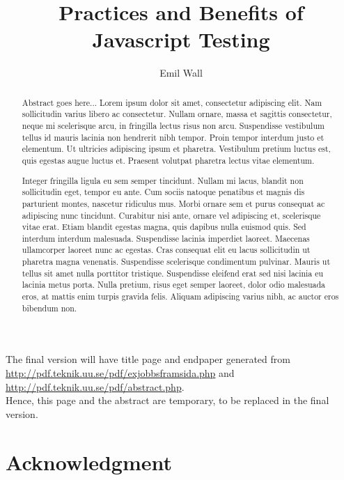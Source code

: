 \documentclass[11pt]{article}
\title{Practices and Benefits of Javascript Testing} %
\author{Emil Wall}
\begin{document}

\maketitle

\vspace{100pt}
The final version will have title page and endpaper generated from \\
\url{http://pdf.teknik.uu.se/pdf/exjobbsframsida.php} and \\
\url{http://pdf.teknik.uu.se/pdf/abstract.php}. \\
Hence, this page and the abstract are temporary, to be replaced in the final version.

\newpage
\clearpage\mbox{}\clearpage
\newpage

\begin{abstract}
Abstract goes here... Lorem ipsum dolor sit amet, consectetur adipiscing elit. Nam sollicitudin varius libero ac consectetur. Nullam ornare, massa et sagittis consectetur, neque mi scelerisque arcu, in fringilla lectus risus non arcu. Suspendisse vestibulum tellus id mauris lacinia non hendrerit nibh tempor. Proin tempor interdum justo et elementum. Ut ultricies adipiscing ipsum et pharetra. Vestibulum pretium luctus est, quis egestas augue luctus et. Praesent volutpat pharetra lectus vitae elementum.

Integer fringilla ligula eu sem semper tincidunt. Nullam mi lacus, blandit non sollicitudin eget, tempor eu ante. Cum sociis natoque penatibus et magnis dis parturient montes, nascetur ridiculus mus. Morbi ornare sem et purus consequat ac adipiscing nunc tincidunt. Curabitur nisi ante, ornare vel adipiscing et, scelerisque vitae erat. Etiam blandit egestas magna, quis dapibus nulla euismod quis. Sed interdum interdum malesuada. Suspendisse lacinia imperdiet laoreet. Maecenas ullamcorper laoreet nunc ac egestas. Cras consequat elit eu lacus sollicitudin ut pharetra magna venenatis. Suspendisse scelerisque condimentum pulvinar. Mauris ut tellus sit amet nulla porttitor tristique. Suspendisse eleifend erat sed nisi lacinia eu lacinia metus porta. Nulla pretium, risus eget semper laoreet, dolor odio malesuada eros, at mattis enim turpis gravida felis. Aliquam adipiscing varius nibh, ac auctor eros bibendum non.
\end{abstract}

\newpage
\clearpage\mbox{}\clearpage
\newpage

\section*{Acknowledgment}
\end{document}
